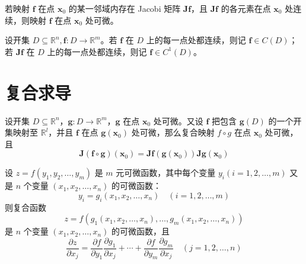 \begin{theorem}
  若映射 $\bm{f}$ 在点 $\bm{x}_0$ 的某一邻域内存在 Jacobi 矩阵 $\bm{Jf}$，且 $\bm{Jf}$ 的各元素在点 $\bm{x}_0$ 处连续，则映射 $\bm{f}$ 在点 $\bm{x}_0$ 处可微。
\end{theorem}

\begin{definition}
  设开集 $D \subseteq \mathbb{R}^n, \bm{f}: D \to \mathbb{R}^m$。若 $\bm{f}$ 在 $D$ 上的每一点处都连续，则记 $\bm{f} \in C(D)$；若 $\bm{Jf}$ 在 $D$ 上的每一点处都连续，则记 $\bm{f} \in C^{1}(D)$。
\end{definition}





\section{复合求导}

\begin{theorem}
  设开集 $D \subseteq \mathbb{R}^n$，$\bm{g}: D \to \mathbb{R}^m$，$\bm{g}$ 在点 $\bm{x}_0$ 处可微。又设 $\bm{f}$ 把包含 $\bm{g}(D)$ 的一个开集映射至 $\mathbb{R}^l$，并且 $\bm{f}$ 在点 $\bm{g}(\bm{x}_0)$ 处可微，那么复合映射 $f \circ g$ 在点 $\bm{x}_0$ 处可微，且 
  \[
      \bm{J}(\bm{f} \circ \bm{g})(\bm{x}_0) = \bm{J}\bm{f}(\bm{g}(\bm{x}_0))\bm{J}\bm{g}(\bm{x}_0)
  \]
\end{theorem}

\begin{corollary}
  设 $z = f(y_1, y_2, \ldots, y_m)$ 是 $m$ 元可微函数，其中每个变量 $y_i(i = 1, 2, \ldots, m)$ 又是 $n$ 个变量 $(x_1, x_2, \ldots, x_n)$ 的可微函数：
  \[
      y_i = g_{i}(x_1, x_2, \ldots, x_n) \quad (i = 1, 2, \ldots, m)
  \]
  则复合函数
  \[
      z = f(g_{1}(x_1, x_2, \ldots, x_n), \ldots, g_{m}(x_1, x_2, \ldots, x_n))
  \]
  是 $n$ 个变量 $(x_1, x_2, \ldots, x_n)$ 的可微函数，且
  \[
      \frac{\partial z}{\partial x_j} = \frac{\partial f}{\partial y_1}\frac{\partial g_1}{\partial x_j} + \cdots + \frac{\partial f}{\partial y_m}\frac{\partial g_m}{\partial x_j} \quad (j = 1, 2, \ldots, n)
  \]
\end{corollary}






\section{}






